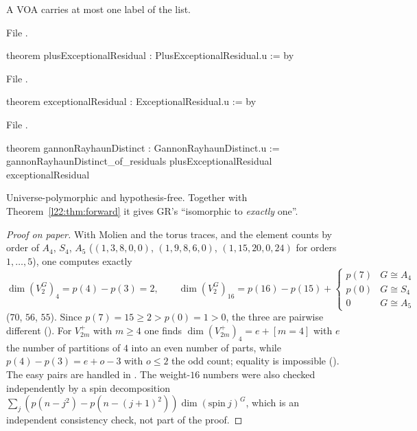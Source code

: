 \begin{theorem}\label{l22:thm:distinct}
A VOA carries at most one label of the list.
\end{theorem}
\noindent File .
\begin{leancode}
theorem plusExceptionalResidual : PlusExceptionalResidual.{u} := by
\end{leancode}
\noindent File .
\begin{leancode}
theorem exceptionalResidual : ExceptionalResidual.{u} := by
\end{leancode}
\noindent File .
\begin{leancode}
theorem gannonRayhaunDistinct : GannonRayhaunDistinct.{u} :=
  gannonRayhaunDistinct_of_residuals plusExceptionalResidual exceptionalResidual
\end{leancode}

\begin{dictionary}
Universe-polymorphic and hypothesis-free. Together with Theorem~\ref{l22:thm:forward} it gives GR's
``isomorphic to \emph{exactly} one''.
\end{dictionary}

\begin{proof}[Proof on paper]
With Molien and the torus traces, and the element counts by order of $A_4$, $S_4$, $A_5$ ($(1,3,8,0,0)$,
$(1,9,8,6,0)$, $(1,15,20,0,24)$ for orders $1,\dots,5$), one computes exactly
\begin{equation*}
\dim(V_2^G)_4=p(4)-p(3)=2,\qquad
\dim(V_2^G)_{16}=p(16)-p(15)+\begin{cases}p(7)&G\cong A_4\\ p(0)&G\cong S_4\\ 0&G\cong A_5\end{cases}
\end{equation*}
($70$, $56$, $55$). Since $p(7)=15\ge2>p(0)=1>0$, the three are pairwise different (). For
$V_{2m}^+$ with $m\ge4$ one finds $\dim(V_{2m}^+)_4=e+[m=4]$ with $e$ the number of partitions of $4$ into an even
number of parts, while $p(4)-p(3)=e+o-3$ with $o\le2$ the odd count; equality is impossible
(). The easy pairs are handled in . The weight-$16$ numbers were
also checked independently by a spin decomposition $\sum_j(p(n-j^2)-p(n-(j+1)^2))\dim(\mathrm{spin}\ j)^G$, which
is an independent consistency check, not part of the proof.
\end{proof}

